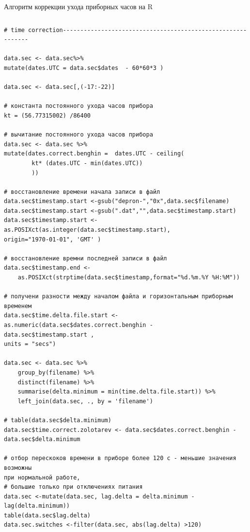 
\begin{ListingEnv}[H]	
	\caption{Алгоритм коррекции ухода 
		приборных часов на R}

	\label{list:timecor}
	\begin{lstlisting}[language={Renhanced}, ]
	\end{lstlisting}
\end{ListingEnv}

\begin{lstlisting}[language={Renhanced}, ]
# time correction------------------------------------------------------------

data.sec <- data.sec%>%
mutate(dates.UTC = data.sec$dates  - 60*60*3 )

data.sec <- data.sec[,(-17:-22)]

# константа постоянного ухода часов прибора
kt = (56.77315002) /86400

# вычитание постоянного ухода часов прибора
data.sec <- data.sec %>%
mutate(dates.correct.benghin =  dates.UTC - ceiling(
		kt* (dates.UTC - min(dates.UTC))
		))

# восстановление времени начала записи в файл
data.sec$timestamp.start <-gsub("depron-","0x",data.sec$filename)
data.sec$timestamp.start <-gsub(".dat","",data.sec$timestamp.start)
data.sec$timestamp.start <- as.POSIXct(as.integer(data.sec$timestamp.start), 
origin="1970-01-01", 'GMT' )

# восстановление времни последней записи в файл
data.sec$timestamp.end <- 
	as.POSIXct(strptime(data.sec$timestamp,format="%d.%m.%Y %H:%M"))

# получени разности между началом файла и горизонтальным приборным временем
data.sec$time.delta.file.start <- as.numeric(data.sec$dates.correct.benghin - 
data.sec$timestamp.start ,
units = "secs") 

data.sec <- data.sec %>%
	group_by(filename) %>%
	distinct(filename) %>%
	summarise(delta.minimum = min(time.delta.file.start)) %>%
	left_join(data.sec, ., by = 'filename')

# table(data.sec$delta.minimum)
data.sec$time.correct.zolotarev <- data.sec$dates.correct.benghin - 
data.sec$delta.minimum 

# отбор перескоков времени в приборе более 120 с - меньшие значения возможны 
при нормальной работе, 
# большие только при отключениях питания
data.sec <-mutate(data.sec, lag.delta = delta.minimum - lag(delta.minimum))
table(data.sec$lag.delta)
data.sec.switches <-filter(data.sec, abs(lag.delta) >120)


\end{lstlisting}
